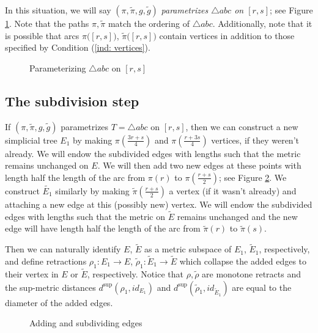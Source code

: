 \documentclass[11pt, leqno]{amsart}
\theoremstyle{definition}\newtheorem{definition}[theorem]{Definition}
\newcommand{\s}{\operatorname{sup}}
\begin{document}
\noindent In this situation, we will say $(\pi,\tilde \pi, g,\tilde g)$ \emph{parametrizes $\triangle abc$ on $[r,s]$}; see Figure \ref{fig:basecse}. Note that the paths $\pi,\tilde\pi$ match the ordering of $\triangle abc$. Additionally, note that it is possible that arcs $\pi\big([r,s]\big)$, $\tilde \pi\big([r,s]\big)$ contain vertices in addition to those specified by Condition (\ref{ind: vertices}).

\begin{figure}[ht]
    \centering
        {\tiny\def\svgwidth{.75\textwidth}}
    \caption{Parameterizing $\triangle abc$ on $[r,s]$}
    \label{fig:basecse}
\end{figure}

\subsection{The subdivision step}\label{sec: subdivision}
If $(\pi,\tilde \pi, g,\tilde g)$ parametrizes $T=\triangle abc$ on $[r,s]$, then we can construct a new simplicial tree  $E_1$  by making  $\pi(\frac{3r+s}{4})$ and $\pi(\frac{r+3s}{4})$ vertices, if they weren't already.  We will endow the subdivided edges with lengths such that the metric remains unchanged on $E$.  We will then add two new edges at these points with length half the length of the arc from $\pi(r)$ to $\pi(\frac{r+s}{2})$; see Figure \ref{fig:step1}. We construct $\tilde{E_1}$ similarly by making $\tilde \pi(\frac{r+s}{2})$ a vertex (if it wasn't already) and attaching a new edge at this (possibly new) vertex.  We will endow the subdivided edges with lengths such that the metric on $\tilde E$ remains unchanged and the new edge will have length half the length of the arc from $\tilde \pi(r)$ to $\tilde \pi(s)$.

Then we can naturally identify $E$, $\tilde E$ as a metric subspace of $E_1$, $\tilde E_1$, respectively, and define  retractions  $\rho_1: E_1\to E$, $\tilde\rho_1:\tilde E_1\to \tilde E$  which collapse the added edges to their vertex in $E$ or $\tilde E$, respectively.  Notice that $\rho, \tilde \rho$ are monotone retracts and the sup-metric distances $d^{\s}(\rho_1, id_{E_1})$ and $d^{\s}(\tilde \rho_1, id_{\tilde E_1})$ are equal to the diameter of the added edges.

\begin{figure}[ht]
    \centering
        {\tiny\def\svgwidth{\textwidth}}
    \caption{Adding and subdividing edges}
    \label{fig:step1}
\end{figure}
\end{document}
